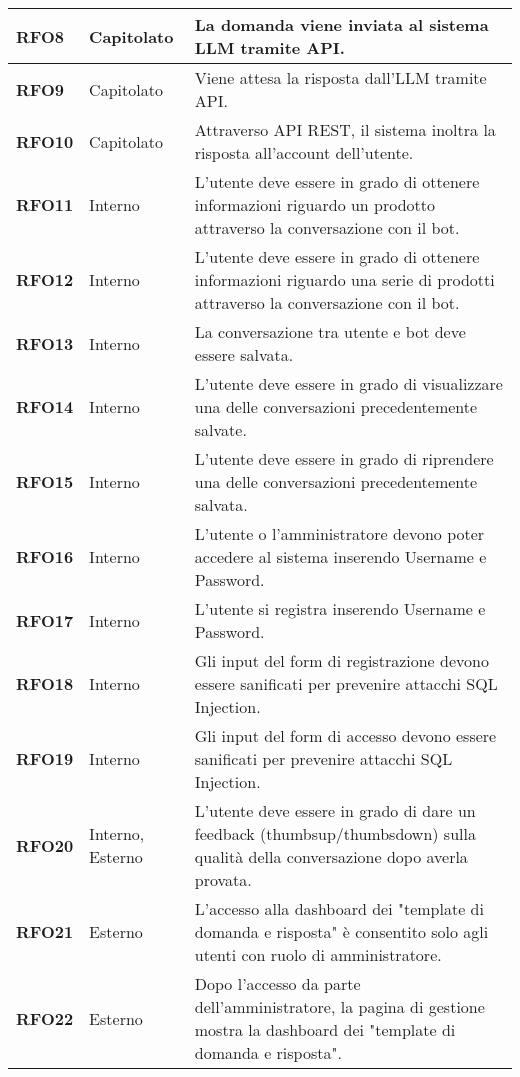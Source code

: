 \begin{longtable}{|>{\centering\arraybackslash}m{}|>{\centering\arraybackslash}m{}|>{\arraybackslash}m{}|}
	\hline
	\textbf{RFO8} & Capitolato 			& La domanda viene inviata al sistema LLM tramite API. \\
	\hline
	\textbf{RFO9} & Capitolato 			& Viene attesa la risposta dall'LLM tramite API. \\
	\hline
	\textbf{RFO10} & Capitolato 		& Attraverso API REST, il sistema inoltra la risposta all'account dell’utente. \\
	\hline
	\textbf{RFO11} & Interno 			& L'utente deve essere in grado di ottenere informazioni riguardo un prodotto attraverso la conversazione con il bot. \\
	\hline
	\textbf{RFO12} & Interno 			& L'utente deve essere in grado di ottenere informazioni riguardo una serie di prodotti attraverso la conversazione con il bot. \\
	\hline
	\textbf{RFO13} & Interno 			& La conversazione tra utente e bot deve essere salvata. \\
	\hline
	\textbf{RFO14} & Interno 			& L'utente deve essere in grado di visualizzare una delle conversazioni precedentemente salvate. \\
	\hline
	\textbf{RFO15} & Interno 			& L'utente deve essere in grado di riprendere una delle conversazioni precedentemente salvata. \\
	\hline
	\textbf{RFO16} & Interno 			& L'utente o l'amministratore devono poter accedere al sistema inserendo Username e Password. \\
	\hline
	\textbf{RFO17} & Interno 			& L'utente si registra inserendo Username e Password. \\
	\hline
	\textbf{RFO18} & Interno 			& Gli input del form di registrazione devono essere sanificati per prevenire attacchi SQL Injection. \\
	\hline
	\textbf{RFO19} & Interno 			& Gli input del form di accesso devono essere sanificati per prevenire attacchi SQL Injection. \\
	\hline
	\textbf{RFO20} & Interno, Esterno 	& L'utente deve essere in grado di dare un feedback (thumbsup/thumbsdown) sulla qualità della conversazione dopo averla provata. \\
	\hline
	\textbf{RFO21} & Esterno 			& L’accesso alla dashboard dei "template di domanda e risposta" è consentito solo agli utenti con ruolo di amministratore. \\
	\hline
	\textbf{RFO22} & Esterno 			& Dopo l’accesso da parte dell'amministratore, la pagina di gestione mostra la dashboard dei "template di domanda e risposta". \\

\end{longtable}
